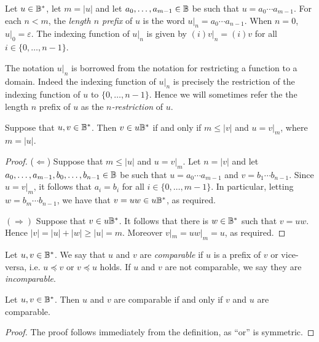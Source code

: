 
\begin{definition}\label{def:restriction_of_finite_string}
    Let \(u\in \mathbb{B}^*\), let \(m = |u|\) and let $a_0, \ldots, a_{m-1} \in \mathbb{B}$ be such that
    $u = a_0\cdots a_{m-1}$. For each $n < m$, the \emph{length $n$ prefix} of $u$
    is the word $u|_n = a_0 \cdots a_{n-1}$. When $n = 0$, $u|_0 = \varepsilon$.
    The indexing function of \(u|_n\) is given by \((i)v|_n=(i)v\) for all \(i\in\{0, \ldots, n-1\}\).
\end{definition}
The notation $u|_n$ is borrowed from the notation for restricting a function to a domain. Indeed the indexing function
of $u|_n$ is precisely the restriction of the indexing function of $u$ to $\{0, \ldots, n-1\}$.
Hence we will sometimes refer the the length $n$ prefix of $u$ as the \emph{$n$-restriction} of $u$.

\begin{lemma}\label{lem:finite_cone_prefixes}
    Suppose that \(u, v\in \mathbb{B}^*\). Then \(v\in u\mathbb{B}^*\) if and only if \(m\leq |v|\) and \(u=v|_{m}\), where $m = |u|$.
\end{lemma}
\begin{proof}
    ($\Leftarrow$) Suppose that \(m\leq |u|\) and \(u = v|_{m}\). Let $n = |v|$ and
    let $a_0, \ldots, a_{m-1}, b_0, \ldots, b_{n-1}\in \mathbb{B}$ be such that
    $u = a_0 \cdots a_{m-1}$ and $v = b_1 \cdots b_{n-1}$. Since $u = v|_{m}$, it follows that
    $a_i = b_i$ for all $i \in \{0, \ldots, m-1\}$.
    In particular, letting $w = b_{m} \cdots b_{n-1}$, we have that $v = uw \in u\mathbb{B}^\ast$,
    as required.

    $(\Rightarrow)$ Suppose that \(v\in u\mathbb{B}^*\). It follows that there is \(w\in \mathbb{B}^*\) such that \(v = uw\).
    Hence \(|v|=|u|+|w|\geq |u| = m\). Moreover $v|_m = uw|_m = u$, as required.
\end{proof}


\begin{definition}%
  \label{def:comparable}
  \rocqok{}
  Let $u, v\in \mathbb{B}^\ast$. We say that $u$ and $v$ are \emph{comparable} if $u$ is a prefix of $v$ or vice-versa, i.e.
  $u \preceq v$ or $v \preceq u$ holds. If $u$ and $v$ are not comparable, we say they are \emph{incomparable}.
\end{definition}

\begin{lemma}%
  \label{lem:comparable_symm}
  \rocqok{}
  Let $u, v\in \mathbb{B}^\ast$. Then $u$ and $v$ are comparable if and only if $v$ and $u$ are comparable.
\end{lemma}
\begin{proof}
  \rocqok{}
  The proof follows immediately from the definition, as ``or'' is symmetric.
\end{proof}



